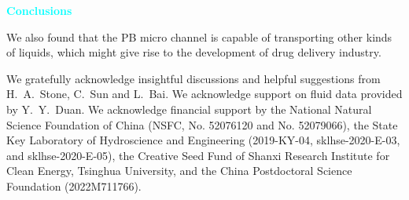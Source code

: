\documentclass[%
 preprint,
 superscriptaddress,
 amsmath,amssymb,
 aps, prl,
]{revtex4-2}
\begin{document}
\textcolor{cyan}{\textbf{Conclusions}}\par
{\color{black}
    We also found that the PB micro channel is capable of transporting other kinds of liquids, which might give rise to the development of drug delivery industry.
}

\begin{acknowledgements}
	We gratefully acknowledge insightful discussions and helpful suggestions from H.~A.~Stone, C.~Sun and L.~Bai. We acknowledge support on fluid data provided by Y.~Y.~Duan. We acknowledge financial support by the National Natural Science Foundation of China (NSFC, No. 52076120 and No. 52079066), the State Key Laboratory of Hydroscience and Engineering (2019-KY-04, sklhse-2020-E-03, and sklhse-2020-E-05), the Creative Seed Fund of Shanxi Research Institute for Clean Energy, Tsinghua University, and the China Postdoctoral Science Foundation (2022M711766).
\end{acknowledgements}

\end{document}
